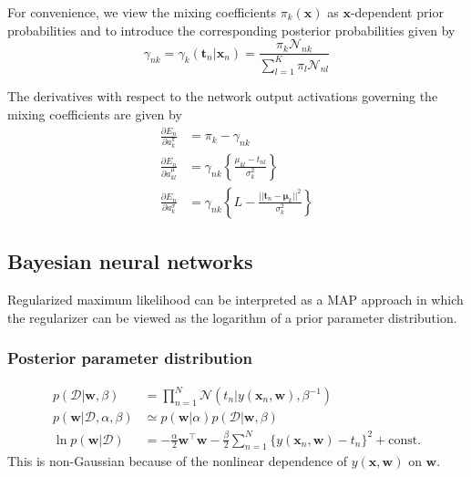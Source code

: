 \documentclass[a4paper]{book}
\newcommand{\up}{\mathrm}
\renewcommand{\bf}{\mathbf}
\renewcommand{\cal}{\mathcal}
\newcommand{\bs}{\boldsymbol}
\begin{document}
For convenience, we view the mixing coefficients $\pi_k(\bf{x})$ as $\bf{x}$-dependent prior probabilities and to introduce the corresponding posterior probabilities given by
\begin{equation}
	\gamma_{nk} = \gamma_k(\bf{t}_n|\bf{x}_n) = \frac{\pi_k \cal{N}_{nk}}{\sum_{l=1}^K \pi_l \cal{N}_{nl}}
\end{equation}

The derivatives with respect to the network output activations governing the mixing coefficients are given by
\begin{align}
	\frac{\partial E_n}{\partial a_{k}^{\pi}} &= \pi_k - \gamma_{nk} \\
	\frac{\partial E_n}{\partial a_{kl}^{\mu}} &= \gamma_{nk} \left\{ \frac{\mu_{kl}-t_{nl}}{\sigma_k^2} \right\} \\
	\frac{\partial E_n}{\partial a_{k}^{\sigma}} &= \gamma_{nk} \left\{ L - \frac{||\bf{t}_n-\bs{\mu}_k||^2}{\sigma_k^2} \right\}
\end{align}

\subsection{Bayesian neural networks}
Regularized maximum likelihood can be interpreted as a MAP approach in which the regularizer can be viewed as the logarithm of a prior parameter distribution.

\subsubsection{Posterior parameter distribution}
\begin{align}
	p(\cal{D}|\bf{w},\beta) &= \prod_{n=1}^N \cal{N}(t_n|y(\bf{x}_n,\bf{w}),\beta^{-1}) \\
	p(\bf{w}|\cal{D},\alpha,\beta) &\simeq p(\bf{w}|\alpha) p(\cal{D}|\bf{w},\beta) \\
	\ln p(\bf{w}|\cal{D}) &= -\frac{\alpha}{2} \bf{w}^{\intercal} \bf{w} - \frac{\beta}{2} \sum_{n=1}^N \{ y(\bf{x}_n,\bf{w})-t_n \}^2 + \up{const}.
\end{align}
This is non-Gaussian because of the nonlinear dependence of $y(\bf{x},\bf{w})$ on $\bf{w}$.
\end{document}
